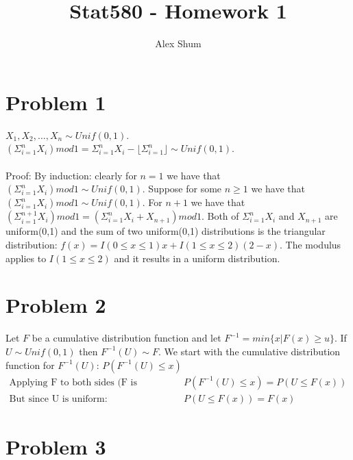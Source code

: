 \documentclass{article}\usepackage[]{graphicx}\usepackage[]{color}
\title{Stat580 - Homework 1}
\author{Alex Shum}
\begin{document}
\maketitle

\section*{Problem 1}
$X_1, X_2, \dots, X_n \sim Unif(0,1)$.  \\
$(\Sigma_{i=1}^n X_i) mod 1 = \Sigma_{i=1}^n X_i - \lfloor \Sigma_{i=1}^n \rfloor \sim Unif(0,1)$. \\
\\
Proof: By induction: clearly for $n=1$ we have that $(\Sigma_{i=1}^n X_i) mod 1 \sim Unif(0,1)$.  Suppose for some $n \ge 1$ we have that $(\Sigma_{i=1}^n X_i) mod 1 \sim Unif(0,1)$.  For $n + 1$ we have that $(\Sigma_{i=1}^{n+1}X_i)mod1 = (\Sigma_{i=1}^n X_i + X_{n+1}) mod 1$.  Both of $\Sigma_{i=1}^n X_i$ and $X_{n+1}$ are uniform(0,1) and the sum of two uniform(0,1) distributions is the triangular distribution: $f(x) = I(0\le x \le 1)x + I(1 \le x \le 2)(2-x)$.  The modulus applies to $I(1 \le x \le 2)$ and it results in a uniform distribution.

\section*{Problem 2}
Let $F$ be a cumulative distribution function and let $F^{-1} = min\{x | F(x) \ge u\}$.  If $U \sim Unif(0,1)$ then $F^{-1}(U) \sim F$.  We start with the cumulative distribution function for $F^{-1}(U)$: $P(F^{-1}(U) \le x)$
\begin{align*}
\text{Applying F to both sides (F is monotonic): }& P(F^{-1}(U) \le x) = P(U \le F(x))\\
\text{But since U is uniform: }& P(U \le F(x)) = F(x)
\end{align*}

\section*{Problem 3}
\end{document}

